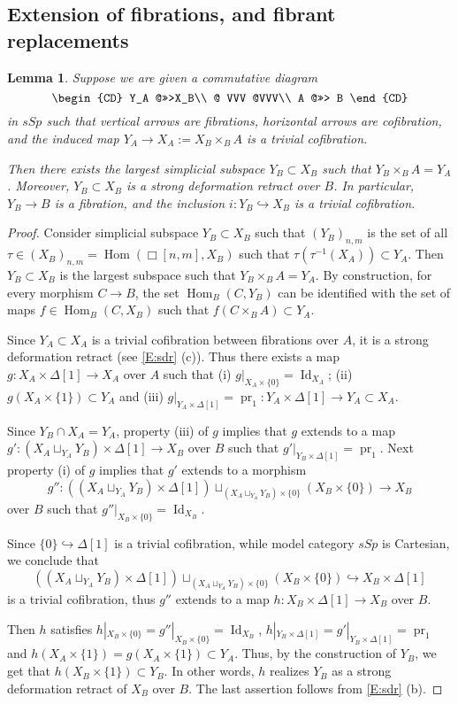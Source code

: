 \documentclass[12pt]{amsart}
\theoremstyle{plain}
\newtheorem{Lem}[Thm]{Lemma}
\theoremstyle{definition}
\numberwithin{equation}{section}
\newcommand{\hra}{\hookrightarrow}
\newcommand{\Dt}{\Delta}
\newcommand{\re}[1]{\ref{E:#1}}
\newcommand{\pr}{\operatorname{pr}}
\newcommand{\Id}{\operatorname{Id}}
\newcommand{\Hom}{\operatorname{Hom}}
\begin{document}
\subsection{Extension of fibrations, and fibrant replacements}

\begin{Lem} \label{L:fib}
Suppose we are given a commutative diagram
\[
\begin{CD}
 Y_A @>>>X_B\\
@ VVV @VVV\\
A @>>> B
\end{CD}
\]
in $sSp$  such that vertical arrows are fibrations, horizontal
arrows are cofibration, and the induced map $Y_A\to
X_A:=X_B\times_B A$ is a trivial cofibration.

Then there exists the largest simplicial subspace $Y_B\subset X_B$
such that $Y_B\times_B A=Y_A$. Moreover, $Y_B\subset X_B$ is a
strong deformation retract over $B$. In particular, $Y_B\to B$ is
a fibration, and the inclusion $i:Y_B\hra X_B$ is a trivial
cofibration.
\end{Lem}

\begin{proof}
Consider simplicial subspace $Y_B\subset X_B$ such that
$(Y_B)_{n,m}$ is the set of all $\tau\in
(X_B)_{n,m}=\Hom(\Box[n,m],X_B)$ such that
$\tau(\tau^{-1}(X_A))\subset Y_A$. Then $Y_B\subset X_B$ is
the largest subspace such that $Y_B\times_B A=Y_A$. By
construction, for every morphism $C\to B$, the set $\Hom_B(C,Y_B)$
can be identified with the set of maps $f\in\Hom_B(C,X_B)$ such
that $f(C\times_B A)\subset Y_A$.

Since $Y_A\subset X_A$ is a trivial cofibration between fibrations
over $A$, it is a strong deformation retract (see \re{sdr} (c)).
Thus there exists a map $g:X_A\times \Dt[1]\to X_A$  over $A$ such
that (i) $g|_{X_A\times\{0\}}=\Id_{X_A}$; (ii)
$g(X_A\times\{1\})\subset Y_A$ and (iii)
$g|_{Y_A\times\Dt[1]}=\pr_1:Y_A\times\Dt[1]\to Y_A\subset X_A$.

Since $Y_B\cap X_A=Y_A$, property (iii) of $g$ implies that $g$
extends to a map $g':(X_A\sqcup_{Y_A}Y_B)\times\Dt[1]\to X_B$ over
$B$ such that $g'|_{Y_B\times\Dt[1]}=\pr_1$. Next property (i) of
$g$ implies that $g'$ extends to a morphism
%
\[
g'':((X_A\sqcup_{Y_A}Y_B)\times\Dt[1])
\sqcup_{(X_A\sqcup_{Y_A}Y_B)\times\{0\}}(X_B\times\{0\}) \to X_B
\]
%
over $B$ such that $g''|_{X_B\times \{0\}}=\Id_{X_B}$.

Since $\{0\}\hra\Dt[1]$ is a trivial cofibration, while model
category $sSp$ is Cartesian, we conclude that
%
\[
((X_A\sqcup_{Y_A}Y_B)\times\Dt[1])\sqcup_{(X_A\sqcup_{Y_A}Y_B)\times\{0\}}
(X_B\times \{0\})\hra X_B\times\Dt[1]
\]
%
is a trivial cofibration, thus $g''$ extends to a map $h:X_B\times
\Dt[1]\to X_B$ over $B$.

Then $h$ satisfies 
$h|_{X_B\times\{0\}}=g''|_{X_B\times\{0\}}=\Id_{X_B}$,
$h|_{Y_B\times \Dt[1]}=g'|_{Y_B\times \Dt[1]}=\pr_1$ and
$h(X_A\times\{1\})=g(X_A\times\{1\})\subset Y_A$. Thus, by the
construction of $Y_B$, we get that $h(X_B\times\{1\})\subset Y_B$.
In other words, $h$ realizes $Y_B$ as a strong deformation retract
of $X_B$ over $B$. The last assertion follows from \re{sdr} (b).
\end{proof}
\end{document}
